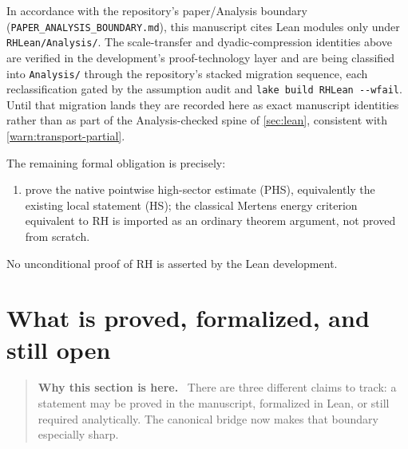 \documentclass[11pt]{article}
\theoremstyle{definition}
\theoremstyle{remark}
\newcommand{\1}{\mathbf{1}}
\newenvironment{motivation}
  {\begin{quote}\small\color{ovvogray}\textbf{Why this section is here.}\ }
  {\end{quote}}
\begin{document}
In accordance with the repository's paper/Analysis boundary (\texttt{PAPER\_ANALYSIS\_BOUNDARY.md}), this manuscript cites Lean modules only under \texttt{RHLean/Analysis/}.  The scale-transfer and dyadic-compression identities above are verified in the development's proof-technology layer and are being classified into \texttt{Analysis/} through the repository's stacked migration sequence, each reclassification gated by the assumption audit and \texttt{lake build RHLean -{}-wfail}.  Until that migration lands they are recorded here as exact manuscript identities rather than as part of the Analysis-checked spine of \cref{sec:lean}, consistent with \cref{warn:transport-partial}.

The remaining formal obligation is precisely:
\begin{enumerate}[leftmargin=1.7em,itemsep=0.3em]
\item prove the native pointwise high-sector estimate (PHS), equivalently the existing local statement (HS); the classical Mertens energy criterion equivalent to RH is imported as an ordinary theorem argument, not proved from scratch.
\end{enumerate}

No unconditional proof of RH is asserted by the Lean development.

\section{What is proved, formalized, and still open}
\label{sec:status}

\begin{motivation}
There are three different claims to track: a statement may be proved in the manuscript, formalized in Lean, or still required analytically.  The canonical bridge now makes that boundary especially sharp.
\end{motivation}
\end{document}
